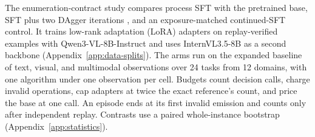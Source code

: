 The enumeration-contract study compares process SFT with the pretrained base, SFT plus two DAgger iterations \citep{ross2011dagger}, and an exposure-matched continued-SFT control. It trains low-rank adaptation (LoRA) adapters \citep{hu2022lora} on replay-verified examples with Qwen3-VL-8B-Instruct \citep{bai2025qwen3vl} and uses InternVL3.5-8B \citep{wang2025internvl35} as a second backbone (Appendix~\ref{app:data-splits}).
The arms run on the expanded baseline of text, visual, and multimodal observations over 24 tasks from 12 domains, with one algorithm under one observation per cell. Budgets count decision calls, charge invalid operations, cap adapters at twice the exact reference's count, and price the base at one call. An episode ends at its first invalid emission and counts only after independent replay. Contrasts use a paired whole-instance bootstrap (Appendix~\ref{app:statistics}).

